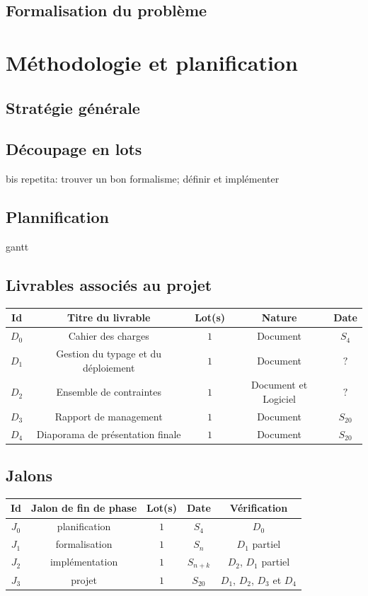 \documentclass[a4paper]{article}
\begin{document}
\subsection{Formalisation du problème}

\section{Méthodologie et planification}
\subsection{Stratégie générale}
\subsection{Découpage en lots}
bis repetita: trouver un bon formalisme; définir et implémenter
\subsection{Plannification}
gantt
\subsection{Livrables associés au projet}
\begin{table}
\centering
\begin{tabular}{c|c|c|c|c}
	Id & Titre du livrable & Lot(s) & Nature & Date \\
	\hline
	\hline
	$D_0$ & Cahier des charges & $1$ & Document & $S_4$ \\
	\hline
	$D_1$ & Gestion du typage et du déploiement & $1$ & Document & $?$ \\
	\hline
	$D_2$ & Ensemble de contraintes & $1$ & Document et Logiciel & $?$ \\
	\hline
	$D_3$ & Rapport de management & $1$ & Document & $S_{20}$ \\
	\hline
	$D_4$ & Diaporama de présentation finale & $1$ & Document & $S_{20}$ \\
\end{tabular}
\end{table}

\subsection{Jalons}
\begin{table}
\centering
\begin{tabular}{c|c|c|c|c}
	Id & Jalon de fin de phase & Lot(s) & Date & Vérification \\
	\hline
	\hline
	$J_0$ & planification & $1$ & $S_4$ & $D_0$ \\
	\hline
	$J_1$ & formalisation & $1$ & $S_n$ & $D_1$ partiel \\
	\hline
	$J_2$ & implémentation & $1$ & $S_{n+k}$ & $D_2$, $D_1$ partiel \\
	\hline
	$J_3$ & projet & $1$ & $S_{20}$ & $D_1$, $D_2$, $D_3$ et $D_4$ \\
\end{tabular}
\end{table}
\end{document}
